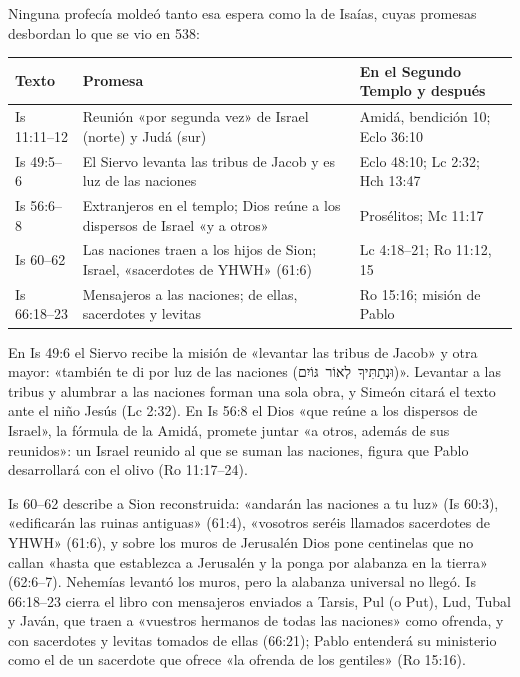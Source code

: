 \documentclass[11pt,letterpaper]{article}
\newcommand{\heb}[1]{\mbox{\foreignlanguage{hebrew}{#1}}}
\begin{document}
Ninguna profecía moldeó tanto esa espera como la de Isaías, cuyas promesas desbordan lo que se vio en 538:

\begin{center}\small
\renewcommand{\arraystretch}{1.2}
\begin{tabular}{>{\RaggedRight\arraybackslash}p{2.4cm}>{\RaggedRight\arraybackslash}p{6.2cm}>{\RaggedRight\arraybackslash}p{5.3cm}}
\toprule
\textbf{Texto} & \textbf{Promesa} & \textbf{En el Segundo Templo y después}\\
\midrule
Is 11:11--12 & Reunión «por segunda vez» de Israel (norte) y Judá (sur) & Amidá, bendición 10; Eclo 36:10\\
Is 49:5--6 & El Siervo levanta las tribus de Jacob y es luz de las naciones & Eclo 48:10; Lc 2:32; Hch 13:47\\
Is 56:6--8 & Extranjeros en el templo; Dios reúne a los dispersos de Israel «y a otros» & Prosélitos; Mc 11:17\\
Is 60--62 & Las naciones traen a los hijos de Sion; Israel, «sacerdotes de YHWH» (61:6) & Lc 4:18--21; Ro 11:12, 15\\
Is 66:18--23 & Mensajeros a las naciones; de ellas, sacerdotes y levitas & Ro 15:16; misión de Pablo\\
\bottomrule
\end{tabular}\end{center}

En Is 49:6 el Siervo recibe la misión de «levantar las tribus de Jacob» y otra mayor: «también te di por luz de las naciones (\heb{וּנְתַתִּיךָ לְאוֹר גּוֹיִם})». Levantar a las tribus y alumbrar a las naciones forman una sola obra, y Simeón citará el texto ante el niño Jesús (Lc 2:32). En Is 56:8 el Dios «que reúne a los dispersos de Israel», la fórmula de la Amidá, promete juntar «a otros, además de sus reunidos»: un Israel reunido al que se suman las naciones, figura que Pablo desarrollará con el olivo (Ro 11:17--24).

Is 60--62 describe a Sion reconstruida: «andarán las naciones a tu luz» (Is 60:3), «edificarán las ruinas antiguas» (61:4), «vosotros seréis llamados sacerdotes de YHWH» (61:6), y sobre los muros de Jerusalén Dios pone centinelas que no callan «hasta que establezca a Jerusalén y la ponga por alabanza en la tierra» (62:6--7). Nehemías levantó los muros, pero la alabanza universal no llegó. Is 66:18--23 cierra el libro con mensajeros enviados a Tarsis, Pul (o Put), Lud, Tubal y Javán, que traen a «vuestros hermanos de todas las naciones» como ofrenda, y con sacerdotes y levitas tomados de ellas (66:21); Pablo entenderá su ministerio como el de un sacerdote que ofrece «la ofrenda de los gentiles» (Ro 15:16).
\end{document}
